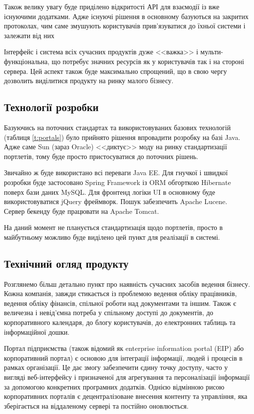 \par Також велику увагу буде приділено відкритості АРІ для взаємодії із вже існуючими додатками.
Адже існуючі рішення в основному базуються на закритих протоколах, чим саме змушують користувачів прив'язуватися до їхньої системи і залежати від них
\par Інтерфейс і система всіх сучасних продуктів дуже <<важка>> і мульти-функціональна, що потребує значних ресурсів як у користувачів так і на стороні сервера.
Цей аспект також буде максимально спрощений, що в свою чергу дозволить виділитися продукту на ринку малого бізнесу.

\subsection{Технології розробки} 
Базуючись на поточних стандартах \cite{portlet2} та використовуваних базових технологій (таблиця \ref{t:portals}) було прийнято рішення впровадити розробку на базі Java.
Адже саме Sun (зараз Oracle) <<диктує>> моду на ринку стандартизації портлетів, тому буде просто пристосуватися до поточних рішень.
\par Звичайно ж буде використано всі переваги Java EE.
Для гнучкої і швидкої розробки буде застосовано Spring Framework із ORM обгорткою Hibernate поверх бази даних MySQL.
Для фронтенд логіки UI в основному буде використовуватися jQuery фреймворк.
Пошук забезпечить Apache Lucene.
Сервер бекенду буде працювати на Apache Tomcat.
\par На даний момент не планується стандартизація щодо портлетів, просто в майбутньому можливо буде виділено цей пункт для реалізації в системі.


\subsection{Технічний огляд продукту}
Розглянемо більш детально пункт про наявність сучасних засобів ведення бізнесу. 
Кожна компанія, завжди стикається із проблемою ведення обліку працівників, ведення обліку фінансів, спільної роботи над документами та іншим.
Також є величезна і невід'ємна потреба у спільному доступі до документів, до корпоративного календаря, до блогу користувачів, до електронних таблиць та інформаційної дошки.
\par Портал підприємства (також відомий як enterprise information portal (EIP) або корпоративний портал) є основою для інтеграції інформації, людей і процесів в рамках організації. 
Це дає змогу забезпечити єдину точку доступу, часто у вигляді веб-інтерфейсу і призначеної для агрегування та персоналізації інформації за допомогою конкретних програмних додатків. Однією відмінною рисою корпоративних порталів є децентралізоване внесення контенту та управління, яка зберігається на віддаленому сервері та постійно оновлюється.
